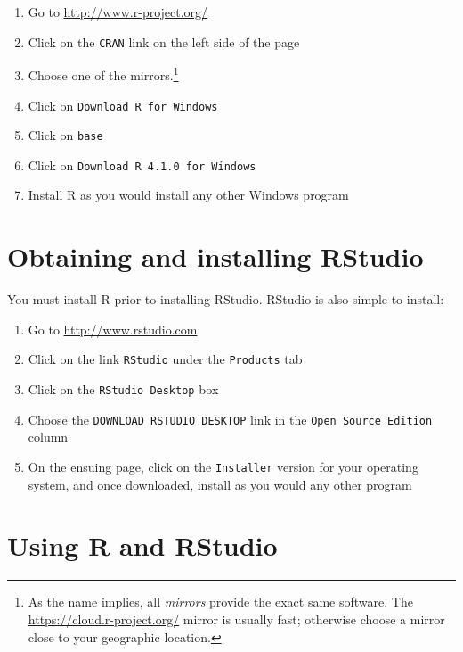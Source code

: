 \documentclass[
]{krantz}
\providecommand{\tightlist}{%
  \setlength{\itemsep}{0pt}\setlength{\parskip}{0pt}}
\begin{document}
\begin{enumerate}
\def\labelenumi{\arabic{enumi}.}
\tightlist
\item
  Go to \url{http://www.r-project.org/}
\item
  Click on the \texttt{CRAN} link on the left side of the page
\item
  Choose one of the mirrors.\footnote{As the name implies, all \emph{mirrors} provide the exact same software. The \url{https://cloud.r-project.org/} mirror is usually fast; otherwise choose a mirror close to your geographic location.}
\item
  Click on \texttt{Download\ R\ for\ Windows}
\item
  Click on \texttt{base}
\item
  Click on \texttt{Download\ R\ 4.1.0\ for\ Windows}
\item
  Install R as you would install any other Windows program
\end{enumerate}

\hypertarget{obtaining-and-installing-rstudio}{%
\section{Obtaining and installing RStudio}\label{obtaining-and-installing-rstudio}}

You must install R prior to installing RStudio. RStudio is also simple to install:

\begin{enumerate}
\def\labelenumi{\arabic{enumi}.}
\tightlist
\item
  Go to \url{http://www.rstudio.com}
\item
  Click on the link \texttt{RStudio} under the \texttt{Products} tab
\item
  Click on the \texttt{RStudio\ Desktop} box
\item
  Choose the \texttt{DOWNLOAD\ RSTUDIO\ DESKTOP} link in the \texttt{Open\ Source\ Edition} column
\item
  On the ensuing page, click on the \texttt{Installer} version for your operating system, and once downloaded, install as you would any other program
\end{enumerate}

\hypertarget{using-r-and-rstudio}{%
\section{Using R and RStudio}\label{using-r-and-rstudio}}
\end{document}
